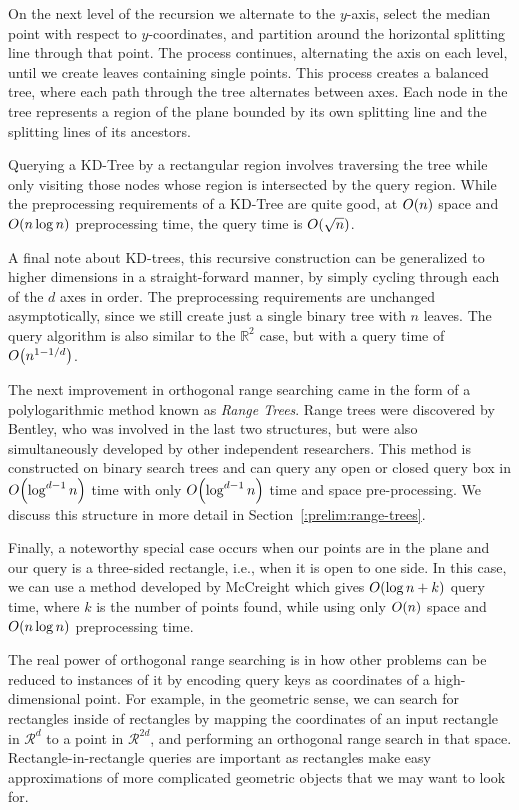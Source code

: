 On the next level of the recursion we alternate to the $y$-axis, select the median point with respect to $y$-coordinates, and partition around the horizontal splitting line through that point.
The process continues, alternating the axis on each level, until we create leaves containing single points.
This process creates a balanced tree, where each path through the tree alternates between axes.
Each node in the tree represents a region of the plane bounded by its own splitting line and the splitting lines of its ancestors.

Querying a KD-Tree by a rectangular region involves traversing the tree while only visiting those nodes whose region is intersected by the query region.
While the preprocessing requirements of a KD-Tree are quite good, at $O\!\left(n\right)$ space and $O\!\left(n\log{n}\right)$ preprocessing time, the query time is $O\!\left(\sqrt{n}\right)$.

A final note about KD-trees, this recursive construction can be generalized to higher dimensions in a straight-forward manner, by simply cycling through each of the $d$ axes in order.
The preprocessing requirements are unchanged asymptotically, since we still create just a single binary tree with $n$ leaves.
The query algorithm is also similar to the $\mathbb{R}^2$ case, but with a query time of $O\!\left(n^{1-1/d}\right)$.

The next improvement in orthogonal range searching came in the form of a polylogarithmic method known as \emph{Range Trees}. 
Range trees were discovered by Bentley\cite{Bentley79}, who was involved in the last two structures, but were also simultaneously developed by other independent researchers.
This method is constructed on binary search trees and can query any open or closed query box in $O\!\left(\log^{d-1}{n}\right)$ time with only $O\!\left(\log^{d-1}{n}\right)$ time and space pre-processing.
We discuss this structure in more detail in Section~\ref{:prelim:range-trees}.


Finally, a noteworthy special case occurs when our points are in the plane and our query is a three-sided rectangle, i.e., when it is open to one side.
In this case, we can use a method developed by McCreight\cite{McCreight85} which gives $O\!\left(\log{n} + k\right)$ query time, where $k$ is the number of points found, while using only $O\!\left(n\right)$ space and $O\!\left(n\log{n}\right)$ preprocessing time.

The real power of orthogonal range searching is in how other problems can be reduced to instances of it by encoding query keys as coordinates of a high-dimensional point.  
For example, in the geometric sense, we can search for rectangles inside of rectangles by mapping the coordinates of an input rectangle in $\mathcal{R}^{d}$ to a point in $\mathcal{R}^{2d}$, and performing an orthogonal range search in that space.
Rectangle-in-rectangle queries are important as rectangles make easy approximations of more complicated geometric objects that we may want to look for.


